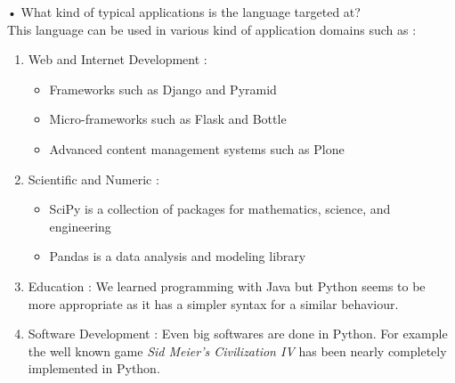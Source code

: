 • What kind of typical applications is the language targeted at?\\
This language can be used in various kind of application domains such as \cite{python_applications}:
\begin{enumerate}
    \item{Web and Internet Development : 
        \begin{itemize}
            \item Frameworks such as Django and Pyramid
            \item Micro-frameworks such as Flask and Bottle
            \item Advanced content management systems such as Plone
        \end{itemize}
    }
    \item{Scientific and Numeric :
        \begin{itemize}
            \item SciPy is a collection of packages for mathematics, science, and engineering
            \item Pandas is a data analysis and modeling library
        \end{itemize}
    
    }
    \item{Education : We learned programming with Java but Python seems to be more appropriate as it has a simpler syntax for a similar behaviour.}
    \item{Software Development : Even big softwares are done in Python. For example the well known game \emph{Sid Meier's Civilization IV} has been nearly completely implemented in Python.}
\end{enumerate}
